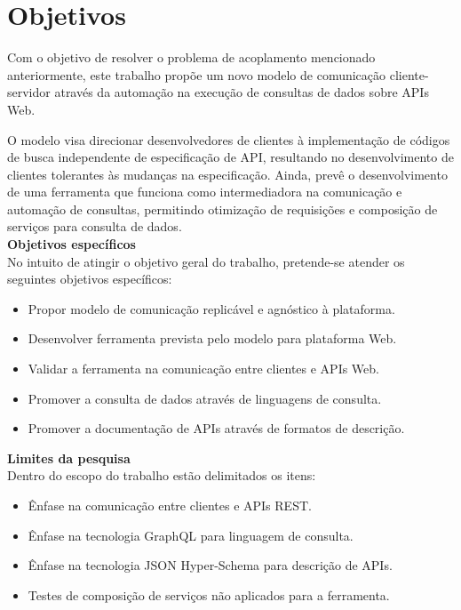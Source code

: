 \section[Objetivos]{Objetivos}

Com o objetivo de resolver o problema de acoplamento mencionado anteriormente, este trabalho propõe um novo modelo de comunicação cliente-servidor através da automação na execução de consultas de dados sobre APIs Web.

O modelo visa direcionar desenvolvedores de clientes à implementação de códigos de busca independente de especificação de API, resultando no desenvolvimento de clientes tolerantes às mudanças na especificação. Ainda, prevê o desenvolvimento de uma ferramenta que funciona como intermediadora na comunicação e automação de consultas, permitindo otimização de requisições e composição de serviços para consulta de dados. \\

\textbf{Objetivos específicos} \\

No intuito de atingir o objetivo geral do trabalho, pretende-se atender os seguintes objetivos específicos:

\begin{itemize}
\item Propor modelo de comunicação replicável e agnóstico à plataforma.
\item Desenvolver ferramenta prevista pelo modelo para plataforma Web.
\item Validar a ferramenta na comunicação entre clientes e APIs Web.
\item Promover a consulta de dados através de linguagens de consulta.
\item Promover a documentação de APIs através de formatos de descrição. \\
\end{itemize}

\textbf{Limites da pesquisa} \\

Dentro do escopo do trabalho estão delimitados os itens:

\begin{itemize}
\item Ênfase na comunicação entre clientes e APIs REST.
\item Ênfase na tecnologia GraphQL para linguagem de consulta.
\item Ênfase na tecnologia JSON Hyper-Schema para descrição de APIs.
\item Testes de composição de serviços não aplicados para a ferramenta.
\end{itemize}
